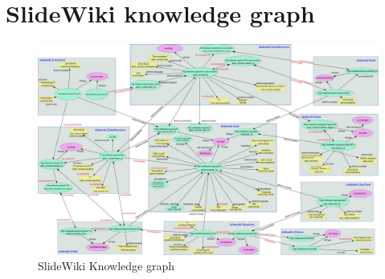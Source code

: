 \section{SlideWiki knowledge graph}


\begin{figure}
    \centering
    \includegraphics[width=\columnwidth]{images/knowledge_graph.png}
    \caption{SlideWiki Knowledge graph}
	\label{fig:knowledge_graph}
\end{figure}




